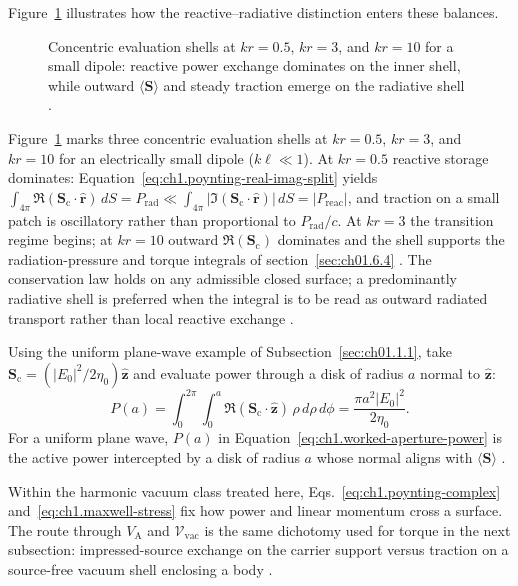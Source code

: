 Figure~\ref{fig:ch1.wp-reactive-vs-radiative} illustrates how the reactive--radiative distinction enters these balances.
\begin{figure}[!htbp]
\centering
\VolIPhysFig{\VolIPhysReactiveVsRadiative}
\caption{Concentric evaluation shells at $kr=0.5$, $kr=3$, and $kr=10$ for a small dipole: reactive power exchange dominates on the inner shell, while outward $\langle\mathbf{S}\rangle$ and steady traction emerge on the radiative shell \cite{stratton1941,chu1948}.}
\label{fig:ch1.wp-reactive-vs-radiative}
\end{figure}

Figure~\ref{fig:ch1.wp-reactive-vs-radiative} marks three concentric evaluation shells at $kr=0.5$, $kr=3$, and $kr=10$ for an electrically small dipole ($k\ell\ll1$). At $kr=0.5$ reactive
storage dominates: Equation~\eqref{eq:ch1.poynting-real-imag-split} yields
\(\int_{4\pi}\Re(\mathbf{S}_\mathrm{c}\cdot\hat{\mathbf{r}})\,dS=P_{\mathrm{rad}}\ll
\int_{4\pi}|\Im(\mathbf{S}_\mathrm{c}\cdot\hat{\mathbf{r}})|\,dS=|P_{\mathrm{reac}}|\), and traction on a
small patch is oscillatory rather than proportional to \(P_{\mathrm{rad}}/c\). At
$kr=3$ the transition regime begins; at
$kr=10$ outward $\Re(\mathbf{S}_\mathrm{c})$ dominates and the shell supports the radiation-pressure and torque integrals of section~\ref{sec:ch01.6.4} \cite{stratton1941,chu1948}.
The conservation law holds on any admissible closed surface; a predominantly radiative shell is preferred when the integral is to be read as outward radiated transport rather than local reactive exchange \cite{chu1948,stratton1941}.

Using the uniform plane-wave example of Subsection~\ref{sec:ch01.1.1}, take $\mathbf{S}_\mathrm{c}=(|E_0|^2/2\eta_0)\hat{\mathbf{z}}$
and evaluate power through a disk of radius $a$ normal to $\hat{\mathbf{z}}$:
\begin{equation}
\label{eq:ch1.worked-aperture-power}
P(a)=\int_0^{2\pi}\!\!\int_0^a \Re(\mathbf{S}_\mathrm{c}\cdot\hat{\mathbf{z}})\,\rho\,d\rho\,d\phi
=\frac{\pi a^2 |E_0|^2}{2\eta_0}.
\end{equation}
For a uniform plane wave, $P(a)$ in Equation~\eqref{eq:ch1.worked-aperture-power} is the active power intercepted by a disk of radius $a$ whose normal aligns with $\langle\mathbf{S}\rangle$ \cite{poynting1884}.

Within the harmonic vacuum class treated here, Eqs.~\eqref{eq:ch1.poynting-complex} and~\eqref{eq:ch1.maxwell-stress} fix how power and linear momentum cross a surface. The route through $V_{\mathrm{A}}$ and $\mathcal{V}_{\mathrm{vac}}$ is the same dichotomy used for torque in the next subsection: impressed-source exchange on the carrier support versus traction on a source-free vacuum shell enclosing a body \cite{stratton1941,harrington2001}.

